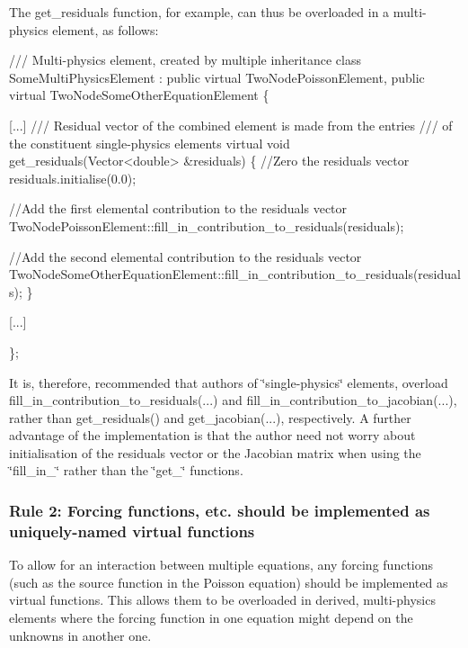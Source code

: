 The {\ttfamily get\+\_\+residuals} function, for example, can thus be overloaded in a multi-\/physics element, as follows\+: 
\begin{DoxyCode}
\textcolor{comment}{/// Multi-physics element, created by multiple inheritance}
\textcolor{comment}{}\textcolor{keyword}{class }SomeMultiPhysicsElement : \textcolor{keyword}{public} \textcolor{keyword}{virtual} TwoNodePoissonElement,
                                \textcolor{keyword}{public} \textcolor{keyword}{virtual} TwoNodeSomeOtherEquationElement
\{

 [...]
\textcolor{comment}{}
\textcolor{comment}{ /// Residual vector of the combined element is made from the entries}
\textcolor{comment}{ /// of the constituent single-physics elements}
\textcolor{comment}{} \textcolor{keyword}{virtual} \textcolor{keywordtype}{void} get\_residuals(Vector<double> &residuals) 
  \{
   \textcolor{comment}{//Zero the residuals vector}
   residuals.initialise(0.0);

  \textcolor{comment}{//Add the first elemental contribution to the residuals vector}
  TwoNodePoissonElement::fill\_in\_contribution\_to\_residuals(residuals);

   \textcolor{comment}{//Add the second elemental contribution to the residuals vector}
   TwoNodeSomeOtherEquationElement::fill\_in\_contribution\_to\_residuals(residuals);
  \}


  [...]

 \};
\end{DoxyCode}


It is, therefore, recommended that authors of \char`\"{}single-\/physics\char`\"{} elements, overload {\ttfamily fill\+\_\+in\+\_\+contribution\+\_\+to\+\_\+residuals}(...) and {\ttfamily fill\+\_\+in\+\_\+contribution\+\_\+to\+\_\+jacobian}(...), rather than {\ttfamily get\+\_\+residuals()} and {\ttfamily get\+\_\+jacobian}(...), respectively. A further advantage of the implementation is that the author need not worry about initialisation of the residuals vector or the Jacobian matrix when using the {\ttfamily \char`\"{}fill\+\_\+in\+\_\+\char`\"{}} rather than the {\ttfamily \char`\"{}get\+\_\+\char`\"{}} functions.\hypertarget{index_virtual}{}\subsubsection{Rule 2\+: Forcing functions, etc. should be implemented as  uniquely-\/named virtual functions}\label{index_virtual}
To allow for an interaction between multiple equations, any forcing functions (such as the source function in the Poisson equation) should be implemented as virtual functions. This allows them to be overloaded in derived, multi-\/physics elements where the forcing function in one equation might depend on the unknowns in another one.

